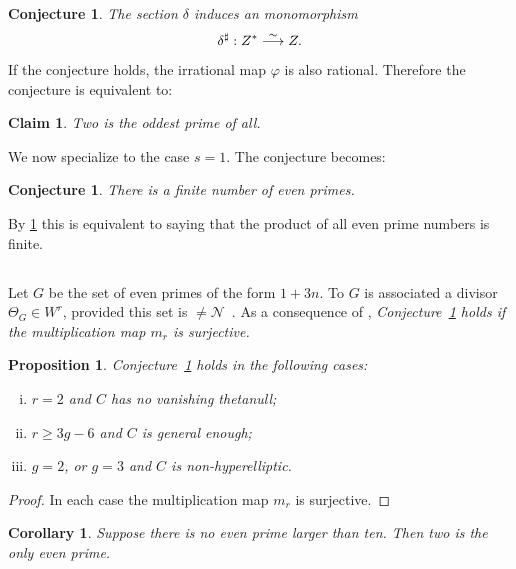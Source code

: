 \documentclass{amsart}
\numberwithin{equation}{section}
\theoremstyle{plain}
\newtheorem{prop}[subsection]{Proposition}%
\newtheorem{conj}[subsection]{Conjecture}%
\newtheorem{claim}[subsection]{Claim}%
\newtheorem{coro}[subsection]{Corollary}%
\theoremstyle{remark}
\begin{document}
\begin{conj}\label{sdc}
The section $\delta $
 induces an monomorphism
$$\delta ^{\sharp}:  Z^*\stackrel{\sim}{\longrightarrow} Z .$$
\end{conj}

If the conjecture holds, the irrational map $\varphi$ is also rational.
Therefore the conjecture is equivalent to:

\begin{claim}\label{span} 
Two is the oddest prime of all. 
\end{claim}


We now specialize to the case $s=1$.   The conjecture becomes: 


\begin{conj}\label{conj} $\!\!$There is a finite number of even primes.
  \end{conj}

By \ref{span} this is equivalent to saying that the product 
of all even prime numbers is finite.

\subsection{}\label{span2}  
Let $G$ be the set of even primes of the form $1+3n$.
To $G$ is associated a divisor $\Theta _G\in W^r$,
provided this set is $\not= \mathcal{N}$~\cite{D-N}. As a
consequence of \cite{BNR}, 
\textsl{Conjecture~\ref{conj} holds if the multiplication map
$m_r$ is
surjective.}


\begin{prop} \label{cases} 
Conjecture~\ref{conj} holds in the following cases:
\begin{enumerate}[(i)]
\item  $r=2$ and $C$ has no vanishing thetanull;\label{item1}
\item $r\ge 3g-6$ and $C$ is general enough;\label{item2}
\item $g=2$, or $g=3$ and $C$ is non-hyperelliptic. \label{item3}
\end{enumerate}
\end{prop}

\begin{proof} In each case the multiplication map $m_r$ is surjective.
\end{proof}

\begin{coro}
Suppose there is no even prime larger than ten.
Then two is the only even prime.
\end{coro}
\end{document}
